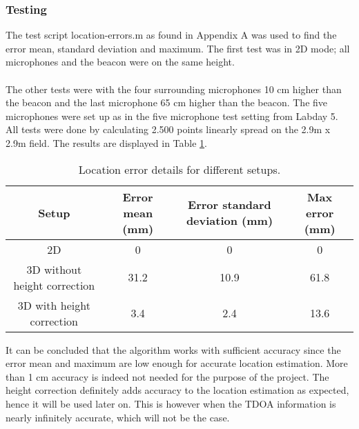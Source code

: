 \documentclass[final]{scrreprt} %
\begin{document}
\subsubsection*{Testing}
The test script location-errors.m as found in Appendix A was used to find the error mean, standard deviation and maximum.
The first test was in 2D mode; all microphones and the beacon were on the same height.
\\ \\
The other tests were with the four surrounding microphones 10 cm higher than the beacon and the last microphone 65 cm higher than the beacon.
The five microphones were set up as in the five microphone test setting from Labday 5.
All tests were done by calculating 2.500 points linearly spread on the 2.9m x 2.9m field.
The results are displayed in Table \ref{tab:errors}.

\begin{table} [H]
\centering
	\begin{tabular}{ c | c | c | c }
  	Setup & Error mean (mm) & Error standard deviation (mm) & Max error (mm) \\ \hline
  	2D & 0 & 0 & 0 \\
  	3D without height correction & 31.2 & 10.9 & 61.8 \\
	3D with height correction & 3.4 & 2.4 & 13.6 \\
	\end{tabular}
\caption{Location error details for different setups.}
\label{tab:errors}
\end{table}

It can be concluded that the algorithm works with sufficient accuracy since the error mean and maximum are low enough for accurate location estimation.
More than 1 cm accuracy is indeed not needed for the purpose of the project.
The height correction definitely adds accuracy to the location estimation as expected, hence it will be used later on.
This is however when the TDOA information is nearly infinitely accurate, which will not be the case.
\end{document}
